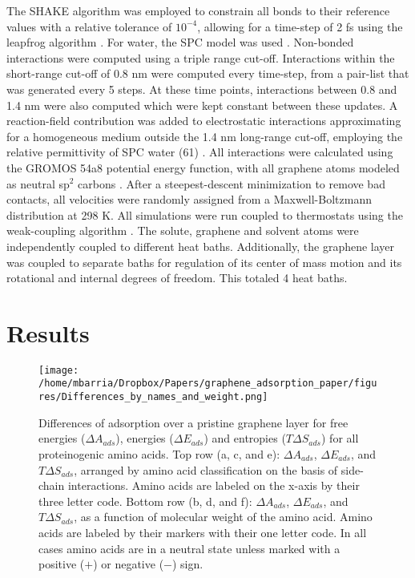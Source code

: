 \documentclass[twoside,twocolumn,9pt]{article}
\begin{document}
The SHAKE algorithm \cite{Ryckaert_1977} was employed to constrain all
bonds to their reference values with a relative tolerance of
$10^{-4}$, allowing for a time-step of 2 fs using the leapfrog
algorithm \cite{Hockney_1977}.  For water, the SPC model was used
\cite{Berendsen_1981}.  Non-bonded interactions were computed using a
triple range cut-off. Interactions within the short-range cut-off of
0.8 nm were computed every time-step, from a pair-list that was
generated every 5 steps.  At these time points, interactions between
0.8 and 1.4 nm were also computed which were kept constant between
these updates.  A reaction-field contribution was added to
electrostatic interactions approximating for a homogeneous medium
outside the 1.4 nm long-range cut-off, employing the relative
permittivity of SPC water (61) \cite{Tironi_1995}. All interactions
were calculated using the GROMOS 54a8 potential energy function, with
all graphene atoms modeled as neutral sp$^2$ carbons \cite{Reif_2012}.
After a steepest-descent minimization to remove bad contacts, all
velocities were randomly assigned from a Maxwell-Boltzmann
distribution at 298 K.  All simulations were run coupled to
thermostats using the weak-coupling algorithm
\cite{Berendsen_1984}. The solute, graphene and solvent atoms were
independently coupled to different heat baths. Additionally, the
graphene layer was coupled to separate baths for regulation of its
center of mass motion and its rotational and internal degrees of
freedom. This totaled 4 heat baths.




\section{Results}

\begin{figure*}[htbp]
\centerline{\texttt{[image: /home/mbarria/Dropbox/Papers/graphene\_adsorption\_paper/figures/Differences\_by\_names\_and\_weight.png]}}
\caption[]{\label{fig:differences} Differences of adsorption over a
  pristine graphene layer for free energies ($\Delta A_{ads}$),
  energies ($\Delta E_{ads}$) and entropies ($T \Delta S_{ads}$) for
  all proteinogenic amino acids. Top row (a, c, and e):
  $\Delta A_{ads}$, $\Delta E_{ads}$, and $T \Delta S_{ads}$, arranged
  by amino acid classification on the basis of side-chain
  interactions. Amino acids are labeled on the x-axis by their three
  letter code. Bottom row (b, d, and f): $\Delta A_{ads}$,
  $\Delta E_{ads}$, and $T \Delta S_{ads}$, as a function of molecular
  weight of the amino acid. Amino acids are labeled by their markers
  with their one letter code. In all cases amino acids are in a
  neutral state unless marked with a positive ($+$) or negative ($-$)
  sign.}

\end{figure*}
\end{document}
